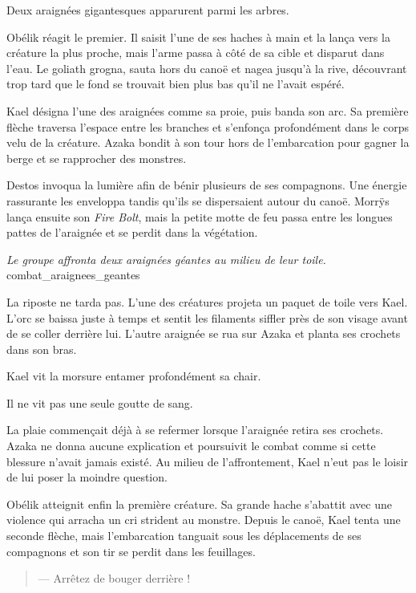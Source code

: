 Deux araignées gigantesques apparurent parmi les arbres.

Obélik réagit le premier. Il saisit l'une de ses haches à main et la lança vers la créature la plus proche, mais l'arme passa à côté de sa cible et disparut dans l'eau. Le goliath grogna, sauta hors du canoë et nagea jusqu'à la rive, découvrant trop tard que le fond se trouvait bien plus bas qu'il ne l'avait espéré.

Kael désigna l'une des araignées comme sa proie, puis banda son arc. Sa première flèche traversa l'espace entre les branches et s'enfonça profondément dans le corps velu de la créature. Azaka bondit à son tour hors de l'embarcation pour gagner la berge et se rapprocher des monstres.

Destos invoqua la lumière afin de bénir plusieurs de ses compagnons. Une énergie rassurante les enveloppa tandis qu'ils se dispersaient autour du canoë. Morrÿs lança ensuite son \textit{Fire Bolt}, mais la petite motte de feu passa entre les longues pattes de l'araignée et se perdit dans la végétation.

{\textit{Le groupe affronta deux araignées géantes au milieu de leur toile.}}
{combat_araignees_geantes}

La riposte ne tarda pas. L'une des créatures projeta un paquet de toile vers Kael. L'orc se baissa juste à temps et sentit les filaments siffler près de son visage avant de se coller derrière lui. L'autre araignée se rua sur Azaka et planta ses crochets dans son bras.

Kael vit la morsure entamer profondément sa chair.

Il ne vit pas une seule goutte de sang.

La plaie commençait déjà à se refermer lorsque l'araignée retira ses crochets. Azaka ne donna aucune explication et poursuivit le combat comme si cette blessure n'avait jamais existé. Au milieu de l'affrontement, Kael n'eut pas le loisir de lui poser la moindre question.

Obélik atteignit enfin la première créature. Sa grande hache s'abattit avec une violence qui arracha un cri strident au monstre. Depuis le canoë, Kael tenta une seconde flèche, mais l'embarcation tanguait sous les déplacements de ses compagnons et son tir se perdit dans les feuillages.

\begin{quote}\itshape

--- Arrêtez de bouger derrière !

\end{quote}

